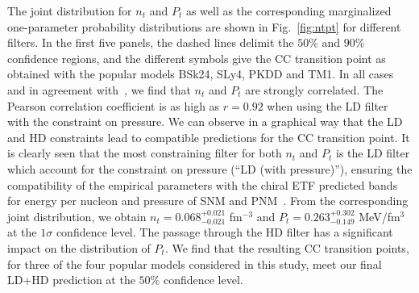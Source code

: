The joint distribution for $n_t$ and $P_t$ as well as the corresponding 
marginalized one-parameter probability distributions are shown in 
Fig.~\ref{fig:ntpt} for different filters. In the first five panels, the dashed
lines delimit the $50\%$ and $90\%$ confidence regions, and the different 
symbols give the CC transition point as obtained with the popular models BSk24, 
SLy4, PKDD and TM1. 
In all cases and in agreement with~\cite{Carreau2019cc}, we find that $n_t$ and 
$P_t$ are strongly correlated. The Pearson correlation coefficient 
is as high as $r=0.92$ when using the LD filter with the constraint on 
pressure.
We can observe in a graphical way that the LD and HD constraints lead to 
compatible predictions for the CC transition point. It is clearly seen that the 
most constraining filter for both $n_t$ and $P_t$ is the LD filter which 
account for the constraint on pressure (``LD (with pressure)''), ensuring the 
compatibility of the empirical parameters with the chiral ETF predicted 
bands for energy per nucleon and pressure of SNM and PNM~\cite{Drischler2016}.
From the corresponding joint distribution, we obtain 
$n_t = 0.068_{-0.021}^{+0.021}$ fm$^{-3}$ and $P_t = 0.263_{-0.149}^{+0.302}$ 
MeV/fm$^3$ at the $1\sigma$ confidence level. The passage through the HD filter 
has a significant impact on the distribution of $P_t$. 
We find that the resulting CC transition points, for three of the four popular 
models considered in this study, meet our final LD+HD prediction at the $50\%$
confidence level.

